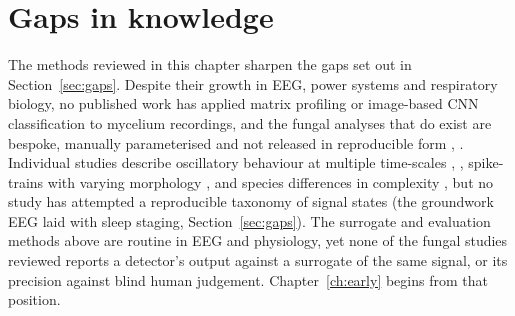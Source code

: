 \section{Gaps in knowledge}
\label{sec:litgaps}

The methods reviewed in this chapter sharpen the gaps set out in Section~\ref{sec:gaps}. Despite their growth in EEG, power systems and respiratory biology, no published work has applied matrix profiling or image-based CNN classification to mycelium recordings, and the fungal analyses that do exist are bespoke, manually parameterised and not released in reproducible form \cite{dehshibi}, \cite{buffi}. Individual studies describe oscillatory behaviour at multiple time-scales \cite{adamatzky2023}, \cite{dehshibi}, spike-trains with varying morphology \cite{slayman}, \cite{adamatzky2022} and species differences in complexity \cite{adamatzky2022}, but no study has attempted a reproducible taxonomy of signal states (the groundwork EEG laid with sleep staging, Section~\ref{sec:gaps}). The surrogate and evaluation methods above are routine in EEG and physiology, yet none of the fungal studies reviewed reports a detector's output against a surrogate of the same signal, or its precision against blind human judgement. Chapter~\ref{ch:early} begins from that position.
